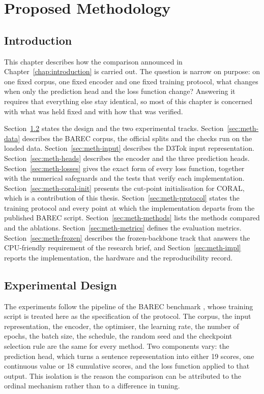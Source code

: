 \chapter{Proposed Methodology}
\label{chap:methodology}

\section{Introduction}

This chapter describes how the comparison announced in Chapter~\ref{chap:introduction} is
carried out. The question is narrow on purpose: on one fixed corpus, one fixed encoder and one
fixed training protocol, what changes when only the prediction head and the loss function
change? Answering it requires that everything else stay identical, so most of this chapter is
concerned with what was held fixed and with how that was verified.

Section~\ref{sec:meth-overview} states the design and the two experimental tracks.
Section~\ref{sec:meth-data} describes the BAREC corpus, the official splits and the checks run
on the loaded data. Section~\ref{sec:meth-input} describes the D3Tok input representation.
Section~\ref{sec:meth-heads} describes the encoder and the three prediction heads.
Section~\ref{sec:meth-losses} gives the exact form of every loss function, together with the
numerical safeguards and the tests that verify each implementation.
Section~\ref{sec:meth-coral-init} presents the cut-point initialisation for CORAL, which is a
contribution of this thesis. Section~\ref{sec:meth-protocol} states the training protocol and
every point at which the implementation departs from the published BAREC script.
Section~\ref{sec:meth-methods} lists the methods compared and the ablations.
Section~\ref{sec:meth-metrics} defines the evaluation metrics.
Section~\ref{sec:meth-frozen} describes the frozen-backbone track that answers the
CPU-friendly requirement of the research brief, and Section~\ref{sec:meth-impl} reports the
implementation, the hardware and the reproducibility record.

\section{Experimental Design}
\label{sec:meth-overview}

The experiments follow the pipeline of the BAREC benchmark \cite{elmadani2025barec}, whose
training script is treated here as the specification of the protocol. The corpus, the input
representation, the encoder, the optimiser, the learning rate, the number of epochs, the batch
size, the schedule, the random seed and the checkpoint selection rule are the same for every
method. Two components vary: the prediction head, which turns a sentence representation into
either 19 scores, one continuous value or 18 cumulative scores, and the loss function applied
to that output. This isolation is the reason the comparison can be attributed to the ordinal
mechanism rather than to a difference in tuning.


